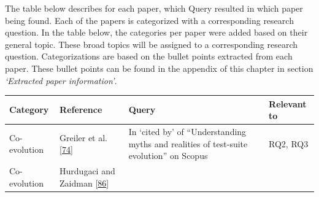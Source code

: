 \documentclass[]{book}
\begin{document}
The table below describes for each paper, which Query resulted in which
paper being found. Each of the papers is categorized with a
corresponding research question. In the table below, the categories per
paper were added based on their general topic. These broad topics will
be assigned to a corresponding research question. Categorizations are
based on the bullet points extracted from each paper. These bullet
points can be found in the appendix of this chapter in section
\emph{`Extracted paper information'}.

\begin{longtable}[]{@{}llll@{}}
\toprule
\begin{minipage}[b]{0.18\columnwidth}\raggedright\strut
Category\strut
\end{minipage} & \begin{minipage}[b]{0.16\columnwidth}\raggedright\strut
Reference\strut
\end{minipage} & \begin{minipage}[b]{0.50\columnwidth}\raggedright\strut
Query\strut
\end{minipage} & \begin{minipage}[b]{0.04\columnwidth}\raggedright\strut
Relevant to\strut
\end{minipage}\tabularnewline
\midrule
\endhead
\begin{minipage}[t]{0.18\columnwidth}\raggedright\strut
Co-evolution\strut
\end{minipage} & \begin{minipage}[t]{0.16\columnwidth}\raggedright\strut
Greiler et al. {[}\protect\hyperlink{ref-greiler2013}{74}{]}\strut
\end{minipage} & \begin{minipage}[t]{0.50\columnwidth}\raggedright\strut
In `cited by' of ``Understanding myths and realities of test-suite
evolution'' on Scopus\strut
\end{minipage} & \begin{minipage}[t]{0.04\columnwidth}\raggedright\strut
RQ2, RQ3\strut
\end{minipage}\tabularnewline
\begin{minipage}[t]{0.18\columnwidth}\raggedright\strut
Co-evolution\strut
\end{minipage} & \begin{minipage}[t]{0.16\columnwidth}\raggedright\strut
Hurdugaci and Zaidman
{[}\protect\hyperlink{ref-hurdugaci2012}{86}{]}\strut
\end{minipage} & \begin{minipage}[t]{0.50\columnwidth}\raggedright\strut

\end{minipage}
\end{longtable}
\end{document}
